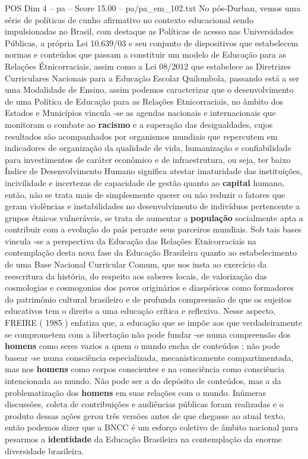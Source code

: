 \begin{textsample}{POS Dim 4 – pa – Score 15.00 – pa/pa\_em\_102.txt}
No pós-Durban, vemos uma série de políticas de cunho afirmativo no contexto educacional sendo impulsionadas no Brasil, com destaque as Políticas de acesso nas Universidades Públicas, a própria Lei 10.639/03 e seu conjunto de dispositivos que estabelecem normas e conteúdos que passam a constituir um modelo de Educação para as Relações Étnicorraciais, assim como a Lei 08/2012 que estabelece as Diretrizes Curriculares Nacionais para a Educação Escolar Quilombola, passando está a ser uma Modalidade de Ensino, assim podemos caracterizar que o desenvolvimento de uma Política de Educação para as Relações Etnicorraciais, no âmbito dos Estados e Municípios vincula -se as agendas nacionais e internacionais que monitoram o combate ao \textbf{racismo} e a superação das desigualdades, cujos resultados são acompanhados por organismos mundiais que repercutem em indicadores de organização da qualidade de vida, humanização e confiabilidade para investimentos de caráter econômico e de infraestrutura, ou seja, ter baixo Índice de Desenvolvimento Humano significa atestar imaturidade das instituições, incivilidade e incertezas de capacidade de gestão quanto ao \textbf{capital} humano, então, não se trata mais de simplesmente querer ou não reduzir o fatores que geram violências e instabilidades no desenvolvimento de indivíduos pertencente a grupos étnicos vulneráveis, se trata de aumentar a \textbf{população} socialmente apta a contribuir com a evolução do país perante seus parceiros mundiais.
Sob tais bases vincula -se a perspectiva da Educação das Relações Etnicorraciais na contemplação desta nova fase da Educação Brasileira quanto ao estabelecimento de uma Base Nacional Curricular Comum, que nos insta ao exercício da reescritura da história, do respeito aos saberes locais, de valorização das cosmologias e cosmogonias dos povos originários e diaspóricos como formadores do patrimônio cultural brasileiro e de profunda compreensão de que os sujeitos educativos tem o direito a uma educação crítica e reflexiva.
Nesse aspecto, FREIRE ( 1985 ) enfatiza que, a educação que se impõe aos que verdadeiramente se comprometem com a libertação não pode fundar -se numa compreensão dos \textbf{homens} como seres vazios a quem o mundo encha de conteúdos ; não pode basear -se numa consciência especializada, mecanisticamente compartimentada, mas nos \textbf{homens} como corpos conscientes e na consciência como consciência intencionada ao mundo.
Não pode ser a do depósito de conteúdos, mas a da problematização dos \textbf{homens} em suas relações com o mundo.
Inúmeras discussões, coleta de contribuições e audiências públicas foram realizadas e o produto dessas ações gerou três versões antes de que chegasse ao atual texto, então podemos dizer que a BNCC é um esforço coletivo de âmbito nacional para pesarmos a \textbf{identidade} da Educação Brasileira na contemplação da enorme diversidade brasileira.

\end{textsample}
